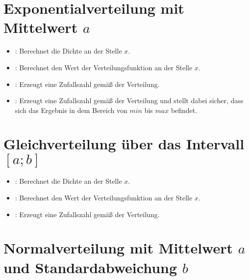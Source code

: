 \section{Exponentialverteilung mit Mittelwert \texorpdfstring{$a$}{a}}

\begin{itemize}

\item
{}:
Berechnet die Dichte an der Stelle $x$.

\item
{}:
Berechnet den Wert der Verteilungsfunktion an der Stelle $x$.

\item
{}:
Erzeugt eine Zufallszahl gemäß der Verteilung.

\item
{}:
Erzeugt eine Zufallszahl gemäß der Verteilung und stellt dabei sicher, dass sich das Ergebnis in dem Bereich von $min$ bis $max$ befindet.

\end{itemize}



\section{Gleichverteilung über das Intervall \texorpdfstring{$[a;b]$}{[a;b]}}

\begin{itemize}

\item
{}:
Berechnet die Dichte an der Stelle $x$.

\item
{}:
Berechnet den Wert der Verteilungsfunktion an der Stelle $x$.

\item
{}:
Erzeugt eine Zufallszahl gemäß der Verteilung.

\end{itemize}



\section{Normalverteilung mit Mittelwert \texorpdfstring{$a$}{a} und Standardabweichung \texorpdfstring{$b$}{b}}

